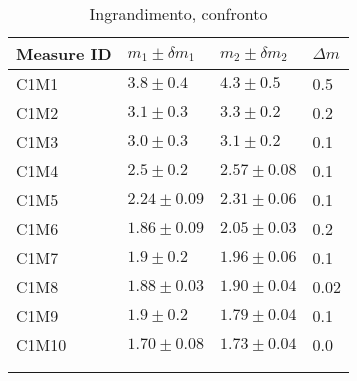 \begin{longtable}[]{@{}llll@{}}
    \toprule
    Measure ID & $m_1 \pm \delta m_1$ & $m_2 \pm \delta m_2$ & $\Delta m$ \tabularnewline
    \midrule
    \endhead
    C1M1 & $3.8   \pm 0.4 $ & $4.3  \pm 0.5 $ & 0.5 \tabularnewline
    C1M2 & $3.1   \pm 0.3 $ & $3.3  \pm 0.2 $ & 0.2 \tabularnewline
    C1M3 & $3.0   \pm 0.3 $ & $3.1  \pm 0.2 $ & 0.1 \tabularnewline
    C1M4 & $2.5   \pm 0.2 $ & $2.57 \pm 0.08$ & 0.1 \tabularnewline
    C1M5 & $2.24  \pm 0.09$ & $2.31 \pm 0.06$ & 0.1 \tabularnewline
    C1M6 & $1.86  \pm 0.09$ & $2.05 \pm 0.03$ & 0.2 \tabularnewline
    C1M7 & $1.9   \pm 0.2 $ & $1.96 \pm 0.06$ & 0.1 \tabularnewline
    C1M8 & $1.88  \pm 0.03$ & $1.90 \pm 0.04$ & 0.02 \tabularnewline
    C1M9 & $1.9   \pm 0.2 $ & $1.79 \pm 0.04$ & 0.1 \tabularnewline
    C1M10& $1.70  \pm 0.08$ & $1.73 \pm 0.04$ & 0.0 \tabularnewline
    \bottomrule
    \label{tab:ms}
    \\
    \caption{Ingrandimento, confronto}
 \end{longtable}
